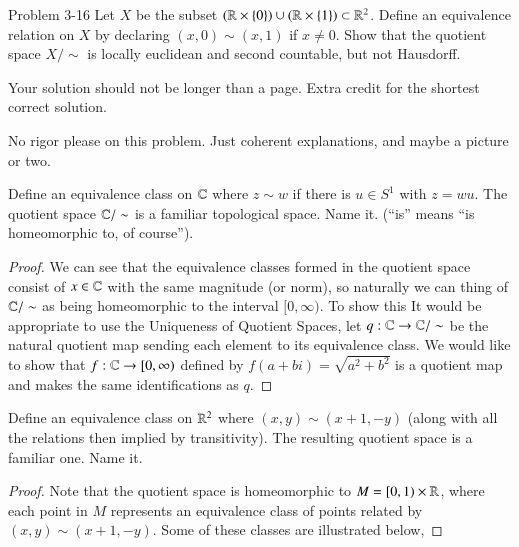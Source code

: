 \documentclass[minion]{homework651}
\begin{document}
\begin{problems}
    \problem Problem 3-16 Let $X$ be the subset $(\mathbb R \times \{0\}) \cup (\mathbb R \times \{1\}) \subset \mathbb R^2$. Define an equivalence relation on $X$ by declaring $(x, 0) \sim (x, 1)$
    if $x \neq 0$. Show that the quotient space $X/\sim$ is locally euclidean and second countable, but not Hausdorff.   
    
    Your solution should not be longer than a page.  Extra credit for the
    shortest correct solution.

    \problem
    No rigor please on this problem.  Just coherent explanations, and maybe a picture or two.
    \begin{subproblems}
    \item Define an equivalence class on $\mathbb C$ where $z\sim w$ if there is $u\in S^1$ with
    $z=wu$.  The quotient space $\mathbb C/\sim$ is a familiar topological space.  Name it.
     (``is'' means ``is homeomorphic to, of course''). 
    \begin{proof}
        We can see that the equivalence classes formed in the quotient space consist of $x \in \mathbb C$ with the same magnitude (or norm), so naturally we can thing of $\mathbb C/\sim$ as 
        being homeomorphic to the interval $[0, \infty)$. To show this It would be appropriate to use the Uniqueness of Quotient Spaces, let $q: \mathbb C \to \mathbb C/\sim$ be the natural 
        quotient map sending each element to its equivalence class. We would like to show that $f:\mathbb C \to [0, \infty)$ defined by $f(a + bi) = \sqrt{a^2 + b^2}$ is a quotient map and makes the same 
        identifications as $q$.
    \end{proof}




    \item Define an equivalence class on $\mathbb R^2$ where $(x,y)\sim (x+1,-y)$ (along with all the relations then implied by transitivity).  The resulting quotient space is a familiar one.  Name it.
    \begin{proof}
        Note that the quotient space is homeomorphic to $M = [0, 1) \times \mathbb R$, where each point in $M$ represents an equivalence class of points related by 
        $(x,y)\sim (x+1,-y)$. Some of these classes are illustrated below, 


\end{proof}
\end{subproblems}
\end{problems}
\end{document}
